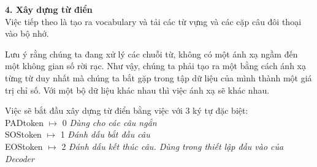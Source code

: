 \textbf{4. Xây dựng từ điển} \\
Việc tiếp theo là tạo ra vocabulary và tải các từ vựng và các cặp câu đôi thoại vào bộ nhớ.

Lưu ý rằng chúng ta đang xử lý các chuỗi từ, không có một ánh xạ ngầm đến một không gian số rời rạc. Như vậy, chúng ta
phải tạo ra một bằng cách ánh xạ từng từ duy nhất mà chúng ta bắt gặp trong tập dữ liệu của mình thành một giá trị chỉ số.
Với một bộ dữ liệu khác nhau thì việc ánh xạ sẽ khác nhau.

Việc sẽ bắt đầu xây dựng từ điển bằng việc với 3 ký tự đặc biệt: \\
PAD\detokenize{_}token \(\mapsto\) 0 \textit{     Dùng cho các câu ngắn} \\
SOS\detokenize{_}token \(\mapsto\) 1 \textit{     Đánh dấu bắt đầu câu} \\
EOS\detokenize{_}token \(\mapsto\) 2 \textit{     Đánh dấu kết thúc câu. Dùng trong thiết lập đầu vào của Decoder} \\

